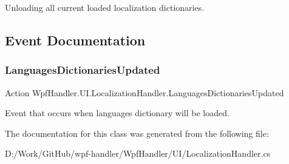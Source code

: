 Unloading all current loaded localization dictionaries. 



\subsection{Event Documentation}
\mbox{\label{class_wpf_handler_1_1_u_i_1_1_localization_handler_afa222c8723785db39e70a9694e2e5398}} 
\subsubsection{\texorpdfstring{Languages\+Dictionaries\+Updated}{LanguagesDictionariesUpdated}}
{\footnotesize\ttfamily Action Wpf\+Handler.\+U\+I.\+Localization\+Handler.\+Languages\+Dictionaries\+Updated\hspace{0.3cm}{\ttfamily [static]}}



Event that occurs when languages dictionary will be loaded. 



The documentation for this class was generated from the following file\+:\begin{DoxyCompactItemize}
\item 
D\+:/\+Work/\+Git\+Hub/wpf-\/handler/\+Wpf\+Handler/\+U\+I/Localization\+Handler.\+cs\end{DoxyCompactItemize}
